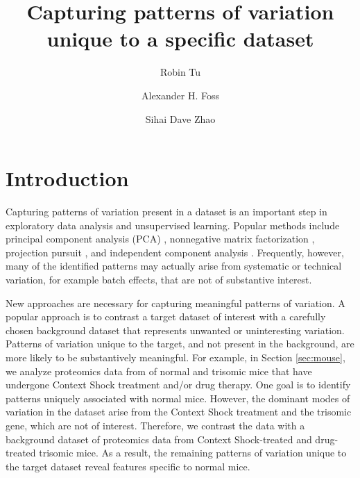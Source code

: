 \documentclass[12pt]{article}
\title{Capturing patterns of variation unique to a specific dataset}
\author[1]{Robin Tu}
\author[2]{Alexander H. Foss}
\author[1]{Sihai Dave Zhao}
\affil[1]{Department of Statistics, University of Illinois at Urbana-Champaign, Champaign, IL}
\affil[2]{Statistical Sciences, Sandia National Laboratories, Albuquerque, NM}
\begin{document}
\maketitle

\section{Introduction}

Capturing patterns of variation present in a dataset is an important step in exploratory data analysis and unsupervised learning. Popular methods include principal component analysis (PCA) \cite{pca}, nonnegative matrix factorization \cite{Lee1999}, projection pursuit \cite{pp}, and independent component analysis \cite{ica}. Frequently, however, many of the identified patterns may actually arise from systematic or technical variation, for example batch effects, that are not of substantive interest.

New approaches are necessary for capturing meaningful patterns of variation. A popular approach is to contrast a target dataset of interest with a carefully chosen background dataset that represents unwanted or uninteresting variation. Patterns of variation unique to the target, and not present in the background, are more likely to be substantively meaningful.
For example, in Section \ref{sec:mouse}, we analyze proteomics data from of normal and trisomic mice that have undergone Context Shock treatment and/or drug therapy. One goal is to identify patterns uniquely associated with normal mice. However, the dominant modes of variation in the dataset arise from the Context Shock treatment and the trisomic gene, which are not of interest. Therefore, we contrast the data with a background dataset of proteomics data from Context Shock-treated and drug-treated trisomic mice. As a result, the remaining patterns of variation unique to the target dataset reveal features specific to normal mice.
\end{document}
